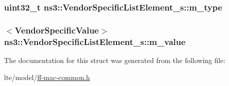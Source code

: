 \subsubsection[{\texorpdfstring{m\+\_\+type}{m_type}}]{\setlength{\rightskip}{0pt plus 5cm}uint32\+\_\+t ns3\+::\+Vendor\+Specific\+List\+Element\+\_\+s\+::m\+\_\+type}\hypertarget{structns3_1_1VendorSpecificListElement__s_a146ac096a51f0b436fbc7b68a57c9146}{}\label{structns3_1_1VendorSpecificListElement__s_a146ac096a51f0b436fbc7b68a57c9146}
\subsubsection[{\texorpdfstring{m\+\_\+value}{m_value}}]{$<${\bf Vendor\+Specific\+Value}$>$ ns3\+::\+Vendor\+Specific\+List\+Element\+\_\+s\+::m\+\_\+value}\hypertarget{structns3_1_1VendorSpecificListElement__s_acfc2eb2018307aaa0f20653b66240566}{}\label{structns3_1_1VendorSpecificListElement__s_acfc2eb2018307aaa0f20653b66240566}


The documentation for this struct was generated from the following file\+:\begin{DoxyCompactItemize}
\item 
lte/model/\hyperlink{ff-mac-common_8h}{ff-\/mac-\/common.\+h}\end{DoxyCompactItemize}
